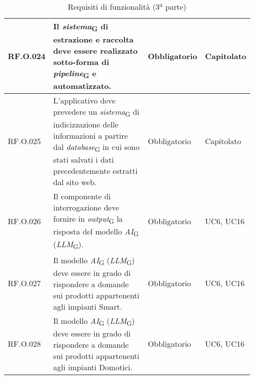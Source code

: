 \begin{table}[H]
\begin{tabular}{|C{2.7cm}|L{7.2cm}|C{2.7cm}|C{2cm}|}
        \hline
         RF.O.024 & Il \textit{sistema}\textsubscript{G} di estrazione e raccolta deve essere realizzato sotto-forma di \textit{pipeline}\textsubscript{G} e automatizzato.
         & Obbligatorio & Capitolato \\
        \hline
         RF.O.025 & L’applicativo deve prevedere un \textit{sistema}\textsubscript{G} di indicizzazione delle informazioni a partire dal
        \textit{database}\textsubscript{G} in cui sono stati salvati i dati precedentemente estratti dal sito web.
         & Obbligatorio & Capitolato \\
        \hline
        RF.O.026 & Il componente di interrogazione deve fornire in \textit{output}\textsubscript{G} la risposta del modello \textit{AI}\textsubscript{G} (\textit{LLM}\textsubscript{G}).
         & Obbligatorio & UC6, UC16 \\
        \hline
        RF.O.027 & Il modello \textit{AI}\textsubscript{G} (\textit{LLM}\textsubscript{G}) deve essere in grado di rispondere a domande sui prodotti appartenenti agli impianti Smart.
         & Obbligatorio & UC6, UC16 \\
        \hline
        RF.O.028 & Il modello \textit{AI}\textsubscript{G} (\textit{LLM}\textsubscript{G}) deve essere in grado di rispondere a domande sui prodotti appartenenti agli impianti Domotici.
         & Obbligatorio & UC6, UC16 \\
        \hline
    \end{tabular}
    \caption{Requisiti di funzionalità (3\textsuperscript{a}  parte)}
\end{table}
